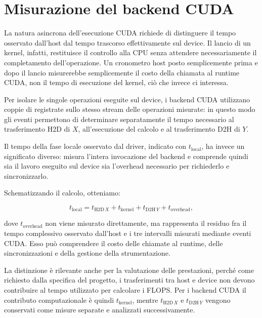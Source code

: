 \section{Misurazione del backend CUDA}
\label{sec:misurazione-cuda}

La natura asincrona dell'esecuzione CUDA richiede di distinguere il tempo
osservato dall'host dal tempo trascorso effettivamente sul device. Il lancio
di un kernel, infatti, restituisce il controllo alla CPU senza attendere
necessariamente il completamento dell'operazione. Un cronometro host posto
semplicemente prima e dopo il lancio misurerebbe semplicemente il costo
della chiamata al runtime CUDA, non il tempo di esecuzione del kernel,
ciò che invece ci interessa.

Per isolare le singole operazioni eseguite sul device, i backend CUDA
utilizzano coppie di \textbf{} registrate sullo stesso stream delle
operazioni misurate: in questo modo gli eventi permettono di determinare
separatamente il tempo necessario al trasferimento H2D di $X$,
all'esecuzione del calcolo e al trasferimento D2H di $Y$.

Il tempo della fase locale osservato dal driver, indicato con
$t_{\mathrm{local}}$, ha invece un significato diverso: misura l'intera
invocazione del backend e comprende quindi sia il lavoro eseguito sul device
sia l'overhead necessario per richiederlo e sincronizzarlo.

Schematizzando il calcolo, otteniamo:

\begin{equation}
t_{\mathrm{local}}
=
t_{\mathrm{H2D}\,X}
+
t_{\mathrm{kernel}}
+
t_{\mathrm{D2H}\,Y}
+
t_{\mathrm{overhead}},
\label{eq:scomposizione-locale}
\end{equation}

dove $t_{\mathrm{overhead}}$ non viene misurato direttamente, ma rappresenta
il residuo fra il tempo complessivo osservato dall'host e i tre intervalli
misurati mediante eventi CUDA. Esso può comprendere il costo delle chiamate
al runtime, delle sincronizzazioni e della gestione della strumentazione.

La distinzione è rilevante anche per la valutazione delle prestazioni,
perché come richiesto dalla specifica del progetto, i trasferimenti tra host e
device non devono contribuire al tempo utilizzato per calcolare i FLOPS.
Per i backend CUDA il contributo computazionale è quindi
$t_{\mathrm{kernel}}$, mentre $t_{\mathrm{H2D}\,X}$ e
$t_{\mathrm{D2H}\,Y}$ vengono conservati come misure separate e analizzati
successivamente.

